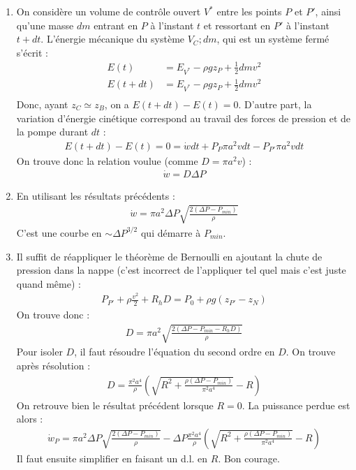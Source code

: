 \begin{correction}
\begin{enumerate}
	\item On considère un volume de contrôle ouvert $V^\ast$ entre les points $P$ et $P'$, ainsi qu'une masse $dm$ entrant en $P$ à l'instant $t$ et ressortant en $P'$ à l'instant $t+dt$. L'énergie mécanique du système ${V_C; dm}$, qui est un système fermé s'écrit :
	\begin{align*}
		E(t)&=E_{V^\ast}-\rho g z_P + \frac{1}{2}dm v^2 \\
		E(t+dt)&=E_{V^\ast}-\rho g z_P + \frac{1}{2}dm v^2 \\
	\end{align*}
	Donc, ayant $z_C\simeq z_B$, on a $E(t+dt)-E(t)=0$. D'autre part, la variation d'énergie cinétique correspond au travail des forces de pression et de la pompe durant $dt$ :
	\begin{align*}
	E(t+dt)-E(t)=0=\dot{w}dt+P_{P} \pi a^2 v dt -P_{P'}\pi a^2 v dt
	\end{align*}
	On trouve donc la relation voulue (comme $D=\pi a^2 v$) :
	\begin{align*}
		\dot{w} = D\Delta P 
	\end{align*}
	
	\item En utilisant les résultats précédents :
	\begin{align*}
		\dot{w}= \pi a^2 \Delta P \sqrt{\frac{2(\Delta P-P_{min})}{\rho}}
	\end{align*}
	 C'est une courbe en $\sim\Delta P^{3/2}$ qui démarre à $P_{min}$.
	
	\item Il suffit de réappliquer le théorème de Bernoulli en ajoutant la chute de pression dans la nappe (c'est incorrect de l'appliquer tel quel mais c'est juste quand même) :
	\begin{align*}
		P_{P'}+\rho\frac{v^2}{2}+R_hD=P_0+\rho g (z_{P'}-z_N)
	\end{align*}
	On trouve donc :
	\begin{align*}
		D=\pi a^2 \sqrt{\frac{2(\Delta P-P_{min}-R_hD)}{\rho}}
	\end{align*}
	Pour isoler $D$, il faut résoudre l'équation du second ordre en $D$. On trouve après résolution :
	\begin{align*}
		D=\frac{\pi^2 a^4}{\rho}\left( \sqrt{R^2+\frac{\rho(\Delta P-P_{min})}{\pi^2 a^4}}-R\right) 
	\end{align*}
On retrouve bien le résultat précédent lorsque $R=0$. La puissance perdue est alors :
\begin{align*}
	\dot{w}_P=\pi a^2 \Delta P \sqrt{\frac{2(\Delta P-P_{min})}{\rho}}-\Delta
	 P\frac{\pi^2 a^4}{\rho}\left( \sqrt{R^2+\frac{\rho(\Delta P-P_{min})}{\pi^2 a^4}}-R\right) 
\end{align*}
Il faut ensuite simplifier en faisant un d.l. en $R$. Bon courage.

\end{enumerate}

\end{correction}


